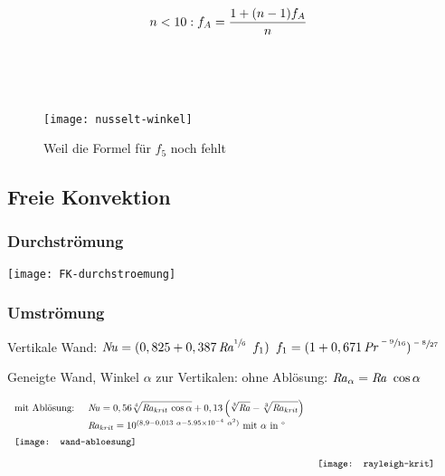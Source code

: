 \[\begin{array}{ll}
			n < 10: f_A = \dfrac{1+ (n-1) f_A}{n}                                                                             &                                                                                  \\
			\null                                                                                                             &                                                                                  \\
			\null                                                                                                             &                                                                                  \\
			\null                                                                                                             &
		\end{array} \]

	\begin{figure}[h]
		\centering
		\texttt{[image: nusselt-winkel]}
		\caption{Weil die Formel für $ f_5 $ noch fehlt}
	\end{figure}


\clearpage
\subsection{Freie Konvektion}
\subsubsection{Durchströmung}
	\texttt{[image: FK-durchstroemung]}

\subsubsection{Umströmung}
	Vertikale Wand: $ \operatorname{\mathit{N\kern-.20em u}} = (0,825 + 0,387 \operatorname{\mathit{R\kern-.10em a}}^{\sfrac{1}{6}} \ f_1) $
		\qquad\qquad $ f_1 = (1 + 0,671 \operatorname{\mathit{P\kern-.10em r}}^{\sfrac{-9}{16}}) ^{\sfrac{-8}{27}} $

	\vskip 0.2cm
	Geneigte Wand, Winkel $ \alpha $ zur Vertikalen: \qquad ohne Ablösung: $ \operatorname{\mathit{R\kern-.10em a}}_{\alpha} = \operatorname{\mathit{R\kern-.10em a}}\ \cos\alpha $

	\setlength{\abovedisplayskip}{-10pt}
	\[ \arraycolsep=0.7em  \def\arraystretch{1.4}
	\begin{array}{llc}
		\text{mit Ablösung:}
			& \Nuss = 0,56 \displaystyle\sqrt[4]{\Rayl_{krit}\, \cos\alpha} + 0,13 \left( \sqrt[3]{\Rayl} - \sqrt[3]{\Rayl_{krit}} \right)
			& \multirow{8}{5cm}{\texttt{[image: rayleigh-krit]}} \\
		 & \Rayl_{krit} = 10^{(8,9 - 0,013\ \alpha - \num{5,95e-4}\ \alpha^2)} \text{ mit } \alpha \text{ in °} & \\
		 \multicolumn{2}{l}{\texttt{[image: wand-abloesung]}}
	\end{array}\]


